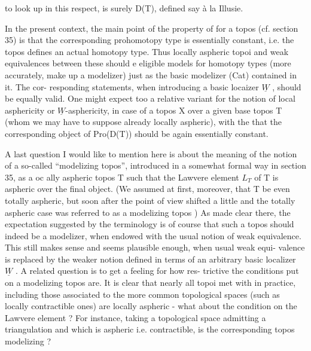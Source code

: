 to look up in this respect,  is surely D(T),  defined say à la Illusie.

In the present context,  the main point of the property of \hand{\uline{\textcolor{black}{local asphe-}}}%
\hand{\uline{\textcolor{black}{ricity}}} for a topos (cf.  section 35)  is that the corresponding prohomotopy
type is essentially constant,  i.e. the topos defines an actual homotopy
type.  Thus locally aspheric topoi  and weak equivalences between these
should e eligible models for homotopy types  (more accurately,  make up
a modelizer)\hand{,} just as the basic modelizer (Cat) contained in it.  The cor-%
responding statements,  when introducing a basic locaizer  $\underline{W}$ ,  should be
equally valid.  One might expect too a relative variant for the notion of
local asphericity or $\underline{W}$-asphericity,  in case of a topos X over a given
base topos T (whom we may have to suppose already locally aspheric),  with
the  that the corresponding object of Pro(D(T)) should be again
essentially constant.

A last question I would like to mention here is about the meaning of
the notion of a so-called ``modelizing topos'',  introduced in a somewhat
formal way in section 35,  as a oc ally aspheric  topos T such that the
Lawvere element $L_T$ of T is aspheric over the final object. (We assumed at
first,  moreover,  that T be even totally aspheric,  but soon after the
point of view  shifted a little and the totally aspheric case was referred 
to as a \hand{\uline{\textcolor{black}{strictly}}} modelizing topos\hand{,} )  As made clear there,  the expectation
suggested by the terminology is of course that such a topos should indeed
be a modelizer,  when endowed with the usual notion of weak equivalence.
This still makes sense and seems plausible enough,  when usual weak equi-%
valence is replaced by the weaker notion defined in terms of an arbitrary
basic localizer $\underline{W}$ .   A related question is to get a feeling for how res-%
trictive the conditions put on a modelizing topos  are.  It is clear
that nearly all topoi met with in practice,  including those associated to
the more common topological spaces (such as locally contractible ones) are
locally aspheric  -  what about the condition on the Lawvere element ?
For instance, taking a topological space admitting a  triangulation and
which is aspheric i.e. contractible,  is the corresponding topos 
modelizing ?

